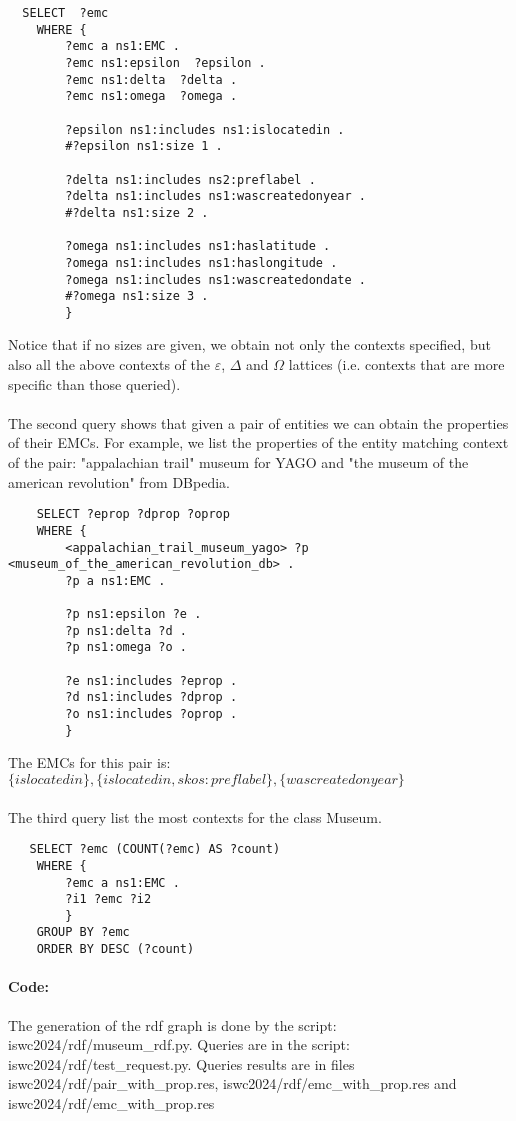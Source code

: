 \documentclass[runningheads]{llncs}
\begin{document}
\begin{lstlisting}
  SELECT  ?emc 
    WHERE {
        ?emc a ns1:EMC .
        ?emc ns1:epsilon  ?epsilon .
        ?emc ns1:delta  ?delta .
        ?emc ns1:omega  ?omega .

        ?epsilon ns1:includes ns1:islocatedin .
        #?epsilon ns1:size 1 .

        ?delta ns1:includes ns2:preflabel .
        ?delta ns1:includes ns1:wascreatedonyear .
        #?delta ns1:size 2 .

        ?omega ns1:includes ns1:haslatitude .
        ?omega ns1:includes ns1:haslongitude .
        ?omega ns1:includes ns1:wascreatedondate .
        #?omega ns1:size 3 .
        }
\end{lstlisting}
Notice that if no sizes are given, we obtain not only the contexts specified, but also all the above contexts of the $\varepsilon$, $\Delta$ and $\Omega$ lattices (i.e. contexts that are more specific than those queried).

\paragraph{}
The second query shows that given a pair of entities we can obtain the properties of their EMCs.
For example, we list the properties of the entity matching context of the pair: "appalachian trail" museum for YAGO and "the museum of the american revolution" from DBpedia.

\begin{lstlisting}
    SELECT ?eprop ?dprop ?oprop
    WHERE {
        <appalachian_trail_museum_yago> ?p <museum_of_the_american_revolution_db> .
        ?p a ns1:EMC .

        ?p ns1:epsilon ?e .
        ?p ns1:delta ?d .
        ?p ns1:omega ?o .

        ?e ns1:includes ?eprop .
        ?d ns1:includes ?dprop .
        ?o ns1:includes ?oprop .
        }
\end{lstlisting}
The EMCs for this pair is: $\{islocatedin\},\{islocatedin,skos:preflabel\},\{wascreatedonyear\}$


\paragraph{}
The third query list the most contexts for the class Museum.
\begin{lstlisting}
   SELECT ?emc (COUNT(?emc) AS ?count)
    WHERE {
        ?emc a ns1:EMC .
        ?i1 ?emc ?i2
        }
    GROUP BY ?emc
    ORDER BY DESC (?count)
\end{lstlisting} 


\paragraph{Code:}
The generation of the rdf graph is done by the script: iswc2024/rdf/museum\_rdf.py.
Queries are in the script: iswc2024/rdf/test\_request.py.
Queries results are in files iswc2024/rdf/pair\_with\_prop.res, iswc2024/rdf/emc\_with\_prop.res and iswc2024/rdf/emc\_with\_prop.res
\end{document}
